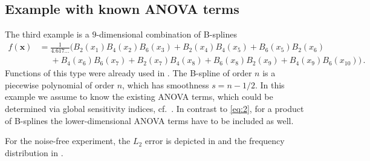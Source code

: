 \documentclass[a4paper]{scrartcl}
\numberwithin{equation}{section}
\begin{document}
\subsection{Example with known ANOVA terms} 

The third example is a $9$-dimensional combination of B-splines
\begin{align*}
    f(\bm x) &= \frac{1}{4.617\dots} \Big( B_2(x_1)B_4(x_2)B_6(x_3) + B_2(x_4)B_4(x_5) + B_6(x_5)B_2(x_6) \\
    &\phantom=+ B_4(x_6)B_6(x_7) + B_2(x_7)B_4(x_8) + B_6(x_8)B_2(x_9) + B_4(x_9)B_6(x_{10}) \Big) \,.
\end{align*}
Functions of this type were already used in \cite{PS21,BPS22,PS22}.
The B-spline of order $n$ is a piecewise polynomial of order $n$, which has smoothness $s = n-1/2$.
In this example we assume to know the existing ANOVA terms, which could be determined via global sensitivity indices, cf.~.
In contrast to \eqref{eq:2}, for a product of B-splines the lower-dimensional ANOVA terms have to be included as well.

For the noise-free experiment, the $L_2$ error is depicted in  and the frequency distribution in .
\end{document}

